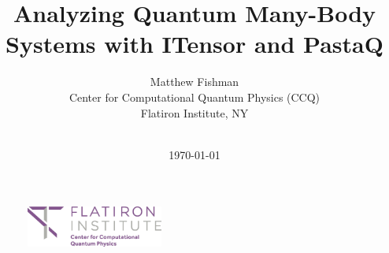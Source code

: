 \documentclass{beamer}
\title{
  \centering
  Analyzing Quantum Many-Body Systems with ITensor and PastaQ
}
\author{
  \centering
  Matthew Fishman \\
  Center for Computational Quantum Physics (CCQ) \\
  Flatiron Institute, NY \\
  \myhref{https://mtfishman.github.io/}{mtfishman.github.io} \\
  \myhref{https://github.com/mtfishman/ITensorTutorials.jl/}{github.com/mtfishman/ITensorTutorials.jl}
}
\date{\today}
\begin{document}
\begin{frame}

  \begin{center}

    \maketitle

  \end{center}

  \begin{figure}[T]

      \centering
      \includegraphics[width=0.4\textwidth]{
        slides/assets/who-am-i-flatiron-institute-ccq.jpg
      }

  \end{figure}

\end{frame}












































\end{document}
